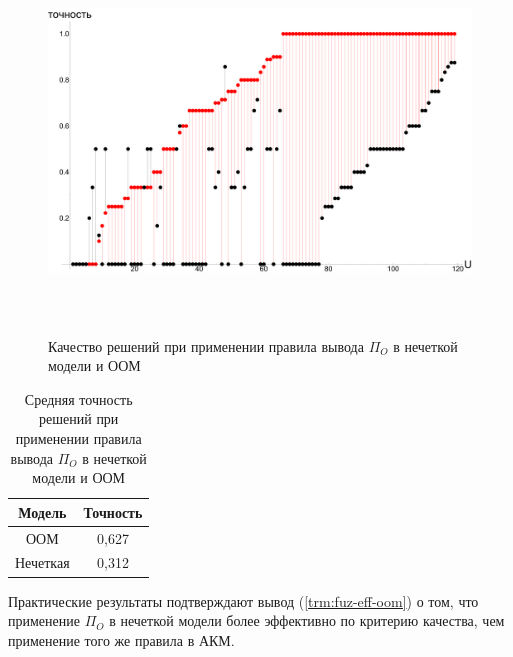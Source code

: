 \begin{figure}[H]
	\caption{Качество решений при применении правила вывода $\Pi_{O}$ в нечеткой модели и ООМ}
	\label{pic:topn_pio}
	\begin{center}
		\includegraphics[width=7in,height=4in]{pics/results/ib_method_in_ib_and_fuzzy_model.pdf}
\end{center}
\end{figure}

\begin{table}[H]
	\caption{Средняя точность решений при применении правила вывода $\Pi_{O}$ в нечеткой модели и ООМ}
  \label{tbl:topn_hamming}
  \begin{center}
	\begin{tabular}{|c|c|}
	  \hline
		Модель& Точность \\ \hline
		ООМ&0,627 \\ \hline
		Нечеткая&0,312 \\ \hline
	\end{tabular}
  \end{center}
\end{table}

Практические результаты подтверждают вывод (\ref{trm:fuz-eff-oom}) о том, что
применение $\Pi_O$ в нечеткой модели более эффективно по критерию качества,
чем применение того же правила в АКМ.

